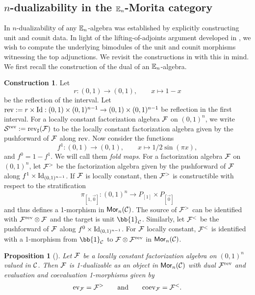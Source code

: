 \documentclass[10pt, reqno, twoside
, final
]{amsart}
\numberwithin{equation}{subsection}%
\theoremstyle{definition}
\theoremstyle{definition}
\theoremstyle{definition}
\theoremstyle{definition}
\newtheorem{cons}[defn]{Construction}
\theoremstyle{definition}
\theoremstyle{definition}
\theoremstyle{definition}
\theoremstyle{definition}
\theoremstyle{definition}
\theoremstyle{plain}
\theoremstyle{definition}
\theoremstyle{plain}
\theoremstyle{definition}
\theoremstyle{plain}
\theoremstyle{definition}
\theoremstyle{definition}
\theoremstyle{plain}
\theoremstyle{plain}
\theoremstyle{definition}
\theoremstyle{plain}
\theoremstyle{plain}
\newtheorem{prop}[defn]{Proposition}
\theoremstyle{plain}
\begin{document}
\subsection{$n$-dualizability in the $\mathbb{E}_n$-Morita category}\label{sec:n-duals}

In \cite{GS} $n$-dualizability of any $\mathbb{E}_n$-algebra was established by explicitly constructing unit and counit data. 
In light of the lifting-of-adjoints argument developed in , we wish to compute the underlying bimodules of the unit and counit morphisms witnessing the top adjunctions. We revisit the constructions in \cite{GS} with this in mind. We first recall the construction of the dual of an $\mathbb{E}_n$-algebra. 

\begin{cons}\label{cons:duals}
Let 
\[r:(0,1)\longrightarrow(0,1),\quad\quad  x\longmapsto 1-x\] 
be the reflection of the interval. Let $\text{rev}  := r \times \text{Id}: (0,1) \times (0,1)^{n-1} \to (0,1) \times (0,1)^{n-1}$ be reflection in the first interval. For a locally constant factorization algebra $\mathcal{F}$ on $(0,1)^n$, we write $\mathcal{S}^{\text{rev}}:=\text{rev}_{\sharp}(\mathcal{F})$ to be the locally constant factorization algebra given by the pushforward of $\mathcal{F}$ along $\text{rev}$. Now consider the functions
\[f^1:(0,1)\longrightarrow (0,1),\qquad x \longmapsto 1/2\sin(\pi x),\]
and $f^0 = 1-f^1$. We will call them {\em fold maps}. For a factorization algebra $\mathcal{F}$ on $(0,1)^n$, let $\mathcal{F}^{>}$ be the factorization algebra given by the pushforward of $\mathcal{F}$ along $f^1\times\text{Id}_{(0,1)^{n-1}}$. If $\mathcal{F}$ is locally constant, then $\mathcal{F}^{>}$ is constructible with respect to the stratification \[\pi_{[1,\vec{0}]}:(0,1)^n\longrightarrow P_{[1]}\times P_{[\vec{0}]}\]
and thus defines a 1-morphism in $\mathsf{Mor}_n(\mathcal{C})$. The source of $\mathcal{F}^{>}$ can be identified with $\mathcal{F}^{\text{rev}} \otimes \mathcal{F}$ and the target is unit $\bb{1}_{\icat}$. Similarly, let $\mathcal{F}^{<}$ be the pushforward of $\mathcal{F}$ along $f^0\times \text{Id}_{(0,1)^{n-1}}$. For $\mathcal{F}$ locally constant, $\mathcal{F}^{<}$ is identified with a 1-morphism from $\bb{1}_{\icat}$ to $\mathcal{F} \otimes \mathcal{F}^{\text{rev}}$ in $\mathsf{Mor}_n(\mathcal{C})$.
\end{cons}
  


\begin{prop}[\cite{GS}]\label{prop:En-alg-dual}
Let $\mathcal{F}$ be a locally constant factorization algebra on $(0,1)^n$ valued in $\mathcal{C}$. Then $\mathcal{F}$ is 1-dualizable as an object in $\mathsf{Mor}_n(\mathcal{C})$ with dual $\mathcal{F}^{\text{rev}}$ and evaluation and coevaluation 1-morphisms given by
\begin{align*}
    \mathrm{ev}_{\mathcal{F}} = {\mathcal{F}^{>}} \qquad \text{and} \qquad \mathrm{coev}_{\mathcal{F}} = {\mathcal{F}^{<}}.
\end{align*}
\end{prop}
\end{document}

